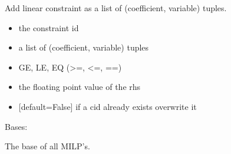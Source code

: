 \documentclass[letterpaper,12pt,english]{sphinxmanual}
\begin{document}
\begin{fulllineitems}
\begin{fulllineitems}
\begin{itemize}
\end{itemize}

\end{fulllineitems}


\begin{fulllineitems}
\label{\detokenize{api/solvers:cbmpy.CBSolverX.LPBase.addLinearConstraint}}
\pysigstartsignatures
\pysiglinewithargsret
{}
{\sphinxparamcomma {}\sphinxparamcomma {}\sphinxparamcomma {}\sphinxparamcomma {}}
{}
\pysigstopsignatures
\sphinxAtStartPar
Add linear constraint as a list of (coefficient, variable) tuples.
\begin{itemize}
\item {} 
\sphinxAtStartPar
{} the constraint id

\item {} 
\sphinxAtStartPar
{} a list of (coefficient, variable) tuples

\item {} 
\sphinxAtStartPar
{} GE, LE, EQ (\textgreater{}=, \textless{}=, ==)

\item {} 
\sphinxAtStartPar
{} the floating point value of the rhs

\item {} 
\sphinxAtStartPar
{} {[}default=False{]} if a cid already exists overwrite it

\end{itemize}

\end{fulllineitems}


\end{fulllineitems}


\begin{fulllineitems}
\label{\detokenize{api/solvers:cbmpy.CBSolverX.MILPBase}}
\pysigstartsignatures
\pysigline
{}
\pysigstopsignatures
\sphinxAtStartPar
Bases: 

\sphinxAtStartPar
The base of all MILP’s.

\end{fulllineitems}
\end{document}
